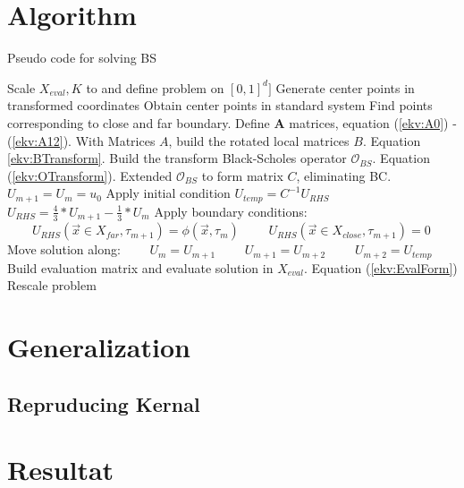 \documentclass[a4paper]{article}      %
\begin{document}
\section*{Algorithm}
\begin{algorithm}[H]
    \centering
    \caption{Pseudo code for solving BS}
    \begin{algorithmic}[1]
    		\State Scale ${X}_{eval}, K$ to and define problem on $[0, 1]^d]$
    		\State Generate center points in transformed coordinates
    		\State Obtain center points in standard system
    		\State Find points corresponding to close and far boundary. 
		\State Define $\mathbf{A}$ matrices, equation (\ref{ekv:A0}) - (\ref{ekv:A12}).     
        \State With Matrices $A$, build the rotated local matrices $B$. Equation \ref{ekv:BTransform}.
        \State Build the transform Black-Scholes operator $\mathcal{O}_{BS}$. Equation (\ref{ekv:OTransform}).
        \State Extended $\mathcal{O}_{BS}$ to form matrix $C$, eliminating BC. $U_{m+1} = U_{m} = u_0$
        \State Apply initial condition 
        \State $U_{temp} = C^{-1}U_{RHS}$
        \State $U_{RHS} = \frac{4}{3}*U_{m+1} - \frac{1}{3}*U_{m}$
        \State Apply boundary conditions: 
        \State $\qquad U_{RHS}(\vec{x}\in X_{far}, \tau_{m+1}) = \phi(\vec{x}, \tau_m)$
        \State $\qquad U_{RHS}(\vec{x}\in X_{close}, \tau_{m+1}) = 0$
        \State Move solution along:
        \State $\qquad U_{m} = U_{m+1}$
        \State $\qquad U_{m+1} = U_{m+2}$
        \State $\qquad U_{m+2} = U_{temp}$
        \EndFor
    \State Build evaluation matrix and evaluate solution in $X_{eval}$. Equation (\ref{ekv:EvalForm})
    \State Rescale problem
    \end{algorithmic}
        \label{alg:1}
\end{algorithm}


\section*{Generalization}

\subsection*{Repruducing Kernal}


\section{Resultat}
\end{document}
